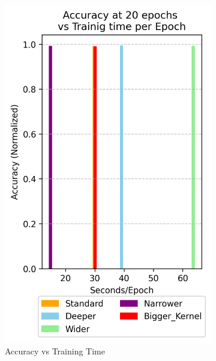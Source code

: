 \documentclass{article}
\begin{document}
\begin{figure}[h!]
\begin{subfigure}[t]{0.3\textwidth}
        \includegraphics[width=\textwidth]{./plots/plot14.png} %
        \caption{Accuracy vs Training Time}
        \label{fig:plot16b}
    \end{subfigure}
    \hspace{0.01\textwidth}
    \begin{subfigure}[t]{0.3\textwidth}
        \centering

\end{subfigure}
\end{figure}
\end{document}
